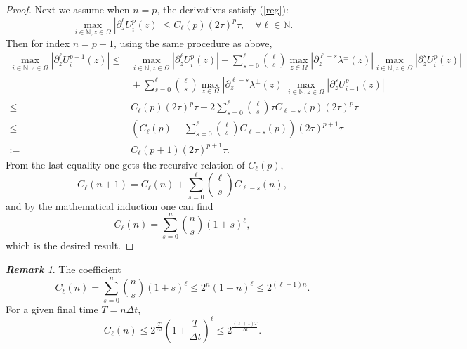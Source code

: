 \documentclass[12pt]{article}
\theoremstyle{plain}
\theoremstyle{remark}
\newtheorem{remark}{\bf{Remark}}[section]
\theoremstyle{remark}
\theoremstyle{remark}
\numberwithin{equation}{section}
\newcommand{\N}{{\mathbb{N}}}
\newcommand{\dnz}[1]{\partial^{#1}_z}
\newcommand{\Dt}{\Delta t}
\begin{document}
\begin{proof}
  Next we assume when $n = p$, the derivatives satisfy (\ref{reg}):
  \begin{equation}
    \underset{i\in\N, z\in\Omega}{\max}|\dnz{\ell} U^p_i(z)|\leq C_\ell(p)(2\tau)^p\tau, \quad\forall \ell\in\N.
  \end{equation}  
  Then for index $n = p+1$, using the same procedure as above,
  \begin{equation}
    \begin{split}
      \underset{i\in\N, z\in\Omega}{\max}|\dnz{\ell} U^{p+1}_i(z)| \leq & {} \underset{i\in\N, z\in\Omega}{\max}|\dnz{\ell} U^p_i(z)| + \sum_{s = 0}^\ell\binom{\ell}{s}\underset{z\in\Omega}{\max}|\dnz{\ell-s} \lambda^{\pm}(z)|\underset{i\in\N, z\in\Omega}{\max}|\dnz{s} U^p_i(z)|
      \\
      & {} + \sum_{s = 0}^\ell\binom{\ell}{s}\underset{z\in\Omega}{\max}|\dnz{\ell-s} \lambda^{\pm}(z)|\underset{i\in\N, z\in\Omega}{\max}|\dnz{s} U^p_{i-1}(z)|
      \\
      \leq & {} C_\ell(p)(2\tau)^p\tau + 2\sum_{s=0}^\ell\binom{\ell}{s}\tau C_{\ell-s}(p)(2\tau)^p\tau
      \\
      \leq & {} \left(C_\ell(p) + \sum_{s=0}^\ell\binom{\ell}{s}C_{\ell-s}(p)\right)(2\tau)^{p+1}\tau
      \\
      := & {} C_\ell(p+1)(2\tau)^{p+1}\tau.
    \end{split}
  \end{equation}
  From the last equality one gets the recursive relation of $C_\ell(p)$,
  \begin{equation}
    C_\ell(n+1) = C_\ell(n) + \sum\limits^\ell_{s=0}\binom{\ell}{s}C_{\ell-s}(n),
  \end{equation}
  and by the mathematical induction one can find
  \begin{equation}
    C_\ell(n) = \sum\limits^n_{s=0}\binom{n}{s}(1+s)^\ell,
  \end{equation}
  which is the desired result.
\end{proof}
\begin{remark}
  The coefficient
  \begin{equation}\label{Cnl}
    C_\ell(n) = \sum\limits^n_{s=0}\binom{n}{s}(1+s)^\ell \leq 2^n(1+n)^\ell\leq 2^{(\ell+1)n}.
  \end{equation}
  For a given final time $T = n\Dt$,
  \begin{equation}
    C_\ell(n)\leq 2^{\frac{T}{\Dt}}\left(1+\frac{T}{\Dt}\right)^\ell\leq 2^{\frac{(\ell+1)T}{\Dt}}.
  \end{equation}
\end{remark}
\end{document}
